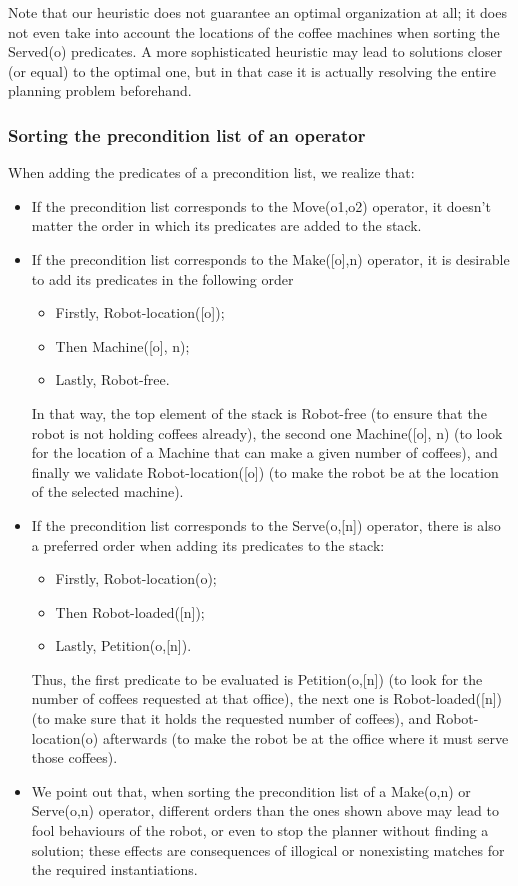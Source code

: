 \documentclass[12pt,a4paper,oneside]{article}
\numberwithin{equation}{section}
\numberwithin{equation}{section}
\theoremstyle{definition}
\begin{document}
Note that our heuristic does not guarantee an optimal organization at all; it does not even take into account the locations of the coffee machines when sorting the Served(o) predicates. A more sophisticated heuristic may lead to solutions closer (or equal) to the optimal one, but in that case it is actually resolving the entire planning problem beforehand.


\subsubsection{Sorting the precondition list of an operator}

When adding the predicates of a precondition list, we realize that:
\begin{itemize}
	\item If the precondition list corresponds to the Move(o1,o2) operator, it doesn’t matter the order in which its predicates are added to the stack. 
	\item If the precondition list corresponds to the Make([o],n) operator, it is desirable to add its predicates in the following order
	\begin{itemize}
		\item Firstly, Robot-location([o]);
		\item Then Machine([o], n);
		\item Lastly, Robot-free.
	\end{itemize}
	In that way, the top element of the stack is Robot-free (to ensure that the robot is not holding coffees already), the second one Machine([o], n) (to look for the location of a Machine that can make a given number of coffees), and finally we validate Robot-location([o]) (to make the robot be at the location of the selected machine). 
	\item If the precondition list corresponds to the Serve(o,[n]) operator, there is also a preferred order when adding its predicates to the stack:
	\begin{itemize}
		\item Firstly, Robot-location(o);
		\item Then Robot-loaded([n]);
		\item Lastly, Petition(o,[n]).
	\end{itemize}
	Thus, the first predicate to be evaluated is Petition(o,[n]) (to look for the number of coffees requested at that office), the next one is Robot-loaded([n]) (to make sure that it holds the requested number of coffees), and Robot-location(o) afterwards (to make the robot be at the office where it must serve those coffees). 
	\item We point out that, when sorting the precondition list of a Make(o,n) or Serve(o,n) operator, different orders than the ones shown above may lead to fool behaviours of the robot, or even to stop the planner without finding a solution; these effects are consequences of illogical or nonexisting matches for the required instantiations. 
\end{itemize}
\end{document}
